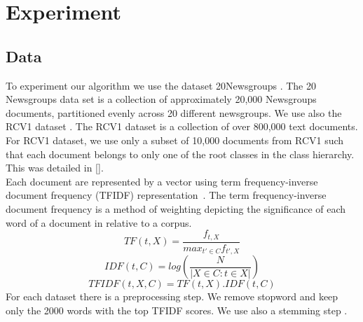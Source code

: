 \section{Experiment}

\subsection{Data}
To experiment our algorithm we use the dataset 20Newsgroups \cite{Newsgroups20}.
The 20 Newsgroups data set is a collection of approximately 20,000 Newsgroups 
documents, partitioned evenly across 20 different newsgroups. We use also the 
RCV1 dataset \cite{Lewis:2004:RNB:1005332.1005345}. The RCV1 dataset is a 
collection of over 800,000 text documents. For RCV1 dataset, we use only a 
subset of 10,000 documents from RCV1 such that each document belongs to only 
one of the root classes in the class hierarchy. This was detailed in 
[\cite{Deap-K-Means}].\\
Each document are represented by a vector using term frequency-inverse document 
frequency (TFIDF) representation~\cite{doi:10.1108/eb026526}.
The term frequency-inverse document frequency is a method of weighting depicting 
the significance of each word of a document in relative to a corpus.
\begin{equation}
TF(t, X) = \frac{f_{t, X}}{max_{t' \in C}f_{t', X}} 
\end{equation}
\begin{equation}
IDF(t, C) = log(\frac{N}{|X \in C : t \in X|})
\end{equation}
\begin{equation}
TFIDF(t,X,C) = TF(t, X) . IDF(t, C)   
\end{equation}
For each dataset there is a preprocessing step. We remove stopword and keep only
the 2000 words with the top TFIDF scores. We use also a stemming step 
\cite{journals/mtcl/Lovins68}. 
